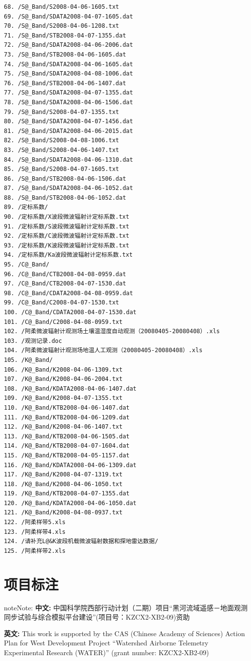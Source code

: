 \documentclass[letterpaper,10pt,english]{sphinxmanual}
\begin{document}
\begin{Verbatim}[commandchars=@\[\]]
68. /S@_Band/S2008-04-06-1605.txt
69. /S@_Band/SDATA2008-04-07-1605.dat
70. /S@_Band/S2008-04-06-1208.txt
71. /S@_Band/STB2008-04-07-1355.dat
72. /S@_Band/SDATA2008-04-06-2006.dat
73. /S@_Band/STB2008-04-06-1605.dat
74. /S@_Band/SDATA2008-04-06-1605.dat
75. /S@_Band/SDATA2008-04-08-1006.dat
76. /S@_Band/STB2008-04-06-1407.dat
77. /S@_Band/SDATA2008-04-07-1355.dat
78. /S@_Band/SDATA2008-04-06-1506.dat
79. /S@_Band/S2008-04-07-1355.txt
80. /S@_Band/SDATA2008-04-07-1456.dat
81. /S@_Band/SDATA2008-04-06-2015.dat
82. /S@_Band/S2008-04-08-1006.txt
83. /S@_Band/S2008-04-06-1407.txt
84. /S@_Band/SDATA2008-04-06-1310.dat
85. /S@_Band/S2008-04-07-1605.txt
86. /S@_Band/STB2008-04-06-1506.dat
87. /S@_Band/SDATA2008-04-06-1052.dat
88. /S@_Band/STB2008-04-06-1052.dat
89. /定标系数/
90. /定标系数/X波段微波辐射计定标系数.txt
91. /定标系数/S波段微波辐射计定标系数.txt
92. /定标系数/C波段微波辐射计定标系数.txt
93. /定标系数/K波段微波辐射计定标系数.txt
94. /定标系数/Ka波段微波辐射计定标系数.txt
95. /C@_Band/
96. /C@_Band/CTB2008-04-08-0959.dat
97. /C@_Band/CTB2008-04-07-1530.dat
98. /C@_Band/CDATA2008-04-08-0959.dat
99. /C@_Band/C2008-04-07-1530.txt
100. /C@_Band/CDATA2008-04-07-1530.dat
101. /C@_Band/C2008-04-08-0959.txt
102. /阿柔微波辐射计观测场土壤温湿度自动观测（20080405-20080408）.xls
103. /观测记录.doc
104. /阿柔微波辐射计观测场地温人工观测（20080405-20080408）.xls
105. /K@_Band/
106. /K@_Band/K2008-04-06-1309.txt
107. /K@_Band/K2008-04-06-2004.txt
108. /K@_Band/KDATA2008-04-06-1407.dat
109. /K@_Band/K2008-04-07-1355.txt
110. /K@_Band/KTB2008-04-06-1407.dat
111. /K@_Band/KTB2008-04-06-1209.dat
112. /K@_Band/K2008-04-06-1407.txt
113. /K@_Band/KTB2008-04-06-1505.dat
114. /K@_Band/KTB2008-04-07-1604.dat
115. /K@_Band/KTB2008-04-05-1157.dat
116. /K@_Band/KDATA2008-04-06-1309.dat
117. /K@_Band/K2008-04-07-1319.txt
118. /K@_Band/K2008-04-06-1050.txt
119. /K@_Band/KTB2008-04-07-1355.dat
120. /K@_Band/KDATA2008-04-06-1050.dat
121. /K@_Band/K2008-04-08-0937.txt
122. /阿柔样带5.xls
123. /阿柔样带4.xls
124. /请补充L@&K波段机载微波辐射数据和探地雷达数据/
125. /阿柔样带2.xls
\end{Verbatim}


\chapter{项目标注}
\label{index:id2}
\begin{notice}{note}{Note:}
\textbf{中文:}
中国科学院西部行动计划（二期）项目“黑河流域遥感－地面观测同步试验与综合模拟平台建设”(项目号：KZCX2-XB2-09)资助

\textbf{英文:}
This work is supported by the CAS (Chinese Academy of Sciences) Action Plan for West Development Project ``Watershed Airborne Telemetry Experimental Research (WATER)'' (grant number: KZCX2-XB2-09)
\end{notice}



\renewcommand{\indexname}{Index}
\printindex
\end{document}
